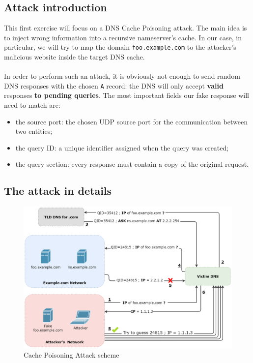 \documentclass[11pt,a4paper]{article}
\begin{document}
\subsection{Attack introduction}
This first exercise will focus on a DNS Cache Poisoning attack. The main idea is
to inject wrong information into a recursive nameserver’s cache. In our case, in particular, we
will try to map the domain \texttt{foo.example.com} to the attacker’s
malicious website inside the target DNS cache.
\\
\\
\noindent
In order to perform such an attack, it is obviously not enough to send random DNS responses
with the chosen \texttt{A} record: the DNS will only accept \textbf{valid} responses \textbf{to pending queries}. The most important fields our fake response will need to match are:
\begin{itemize}
    \item the source port: the chosen UDP source port for the communication between two entities;
    \item the query ID: a unique identifier assigned when the query was created;
    \item the query section: every response must contain a copy of the original request.
\end{itemize}

\subsection{The attack in details}
\label{subsec:attack-details}

\begin{figure}[h]
    \centering
    \includegraphics[width=\textwidth]{cache-poisoning-attack.png}
    \caption{Cache Poisoning Attack scheme}
    \label{fig:cache-poisoning-attack}
\end{figure}
\end{document}
